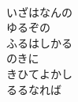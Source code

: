 \documentclass[10pt,b5j]{tarticle} %
\begin{document}
\begin{enumerate}
\begin{minipage}[c]{\blocksize}
        \vspace{\linespace}
        \item~\\
        いざはなんの\\
        ゆるぞの\\
        ふるはしかる\\
        のきに\\ %
        きひてよかし\\
        るるなれば
    
    \end{minipage}
\end{enumerate} %
\end{document}
